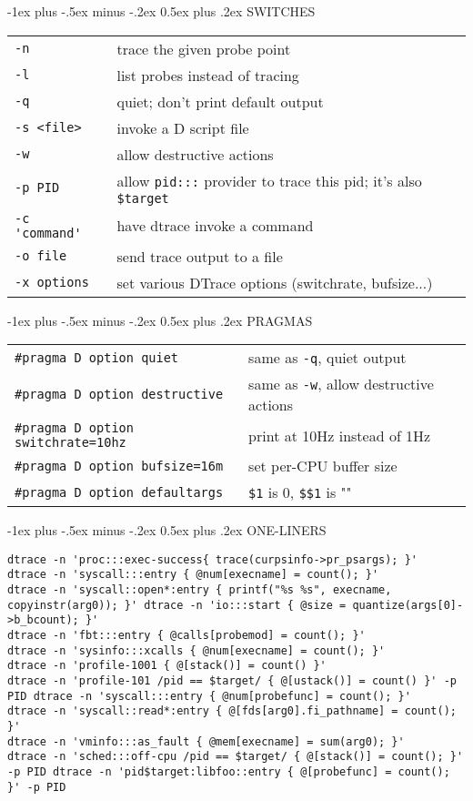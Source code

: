 \documentclass[10pt,landscape]{article}
\makeatletter
\renewcommand{\section}{\@startsection{section}{1}{0mm}%
                                {-1ex plus -.5ex minus -.2ex}%
                                {0.5ex plus .2ex}%
                                {\normalfont\large\bfseries}}
\makeatother
\begin{document}
\begin{multicols}{2}
\section{SWITCHES}
\begin{tabular}{@{}ll@{}}
\verb|-n| & trace the given probe point\\
\verb|-l| & list probes instead of tracing\\
\verb|-q| & quiet; don't print default output\\
  \verb|-s <file>| & invoke a D script file\\
\verb|-w| & allow destructive actions\\
\verb|-p PID| & allow \verb|pid:::| provider to trace this pid; it's also \verb|$target|\\
\verb|-c 'command'| & have dtrace invoke a command\\
\verb|-o file| & send trace output to a file\\
\verb|-x options| & set various DTrace options (switchrate, bufsize...)\\
\end{tabular}

\section{PRAGMAS}
\begin{tabular}{@{}ll@{}}
\verb|#pragma D option quiet| & same as \verb|-q|, quiet output\\
\verb|#pragma D option destructive| & same as \verb|-w|, allow
                                      destructive actions\\
  \verb|#pragma D option switchrate=10hz| & print at 10Hz instead of
                                            1Hz\\
  \verb|#pragma D option bufsize=16m| & set per-CPU buffer size\\
  \verb|#pragma D option defaultargs| & \verb|$1| is 0, \verb|$$1| is ""\\
\end{tabular}

\section{ONE-LINERS}
\begin{lstlisting}
dtrace -n 'proc:::exec-success{ trace(curpsinfo->pr_psargs); }'
dtrace -n 'syscall:::entry { @num[execname] = count(); }'
dtrace -n 'syscall::open*:entry { printf("%s %s", execname, copyinstr(arg0)); }' dtrace -n 'io:::start { @size = quantize(args[0]->b_bcount); }'
dtrace -n 'fbt:::entry { @calls[probemod] = count(); }'
dtrace -n 'sysinfo:::xcalls { @num[execname] = count(); }'
dtrace -n 'profile-1001 { @[stack()] = count() }'
dtrace -n 'profile-101 /pid == $target/ { @[ustack()] = count() }' -p PID dtrace -n 'syscall:::entry { @num[probefunc] = count(); }'
dtrace -n 'syscall::read*:entry { @[fds[arg0].fi_pathname] = count(); }'
dtrace -n 'vminfo:::as_fault { @mem[execname] = sum(arg0); }'
dtrace -n 'sched:::off-cpu /pid == $target/ { @[stack()] = count(); }' -p PID dtrace -n 'pid$target:libfoo::entry { @[probefunc] = count(); }' -p PID
\end{lstlisting}
\end{multicols}
\end{document}
